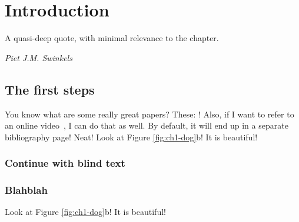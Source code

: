 \cleardoubleevenemptypage
\chapter{Introduction}
\label{ch:intro}
\pgfmathsetmacro\chapclr{\colourarray[1]} %
\hypersetup{
  citecolor  = \chapclr,
  linkcolor  = \chapclr,
  urlcolor   = \chapclr,
}

\epigraph{
  A quasi-deep quote, with minimal relevance to the chapter.
  }{
    \textit{Piet J.M. Swinkels}
}

\clearpage
\section{The first steps}
You know what are some really great papers? These: \cite{gabryelczykHydrogenBondGuidance2019,heesSelfassemblyOppositelyCharged2019,swinkelsRevealingPseudorotationRingopening2021}! Also, if I want to refer to an online video~\cite{ExampleVideo}, I can do that as well. By default, it will end up in a separate bibliography page! Neat! Look at Figure \ref{fig:ch1-dog}b! It is beautiful! 

\subsection{Continue with blind text}

\blindtext[2]
\subsection{Blahblah}
\blindtext[3]
Look at Figure \ref{fig:ch1-dog}b! It is beautiful! 

